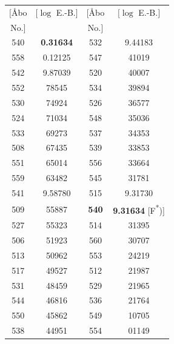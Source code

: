 \documentclass[12pt,a4paper]{article}
\theoremstyle{plain}
\theoremstyle{definition}
\theoremstyle{remark}
\begin{document}
\begin{small}
\begin{center}
\begin{tabular}{|c|c||c|c|}
\hline
$[$\AA bo & $[\log$ E.-B.$]$ & $[$\AA bo & $[\log$ E.-B.$]$ \\
No.$]$ & & No.$]$ & \\
\hline
540 & \textbf{0.31634} & 532 & 9.44183 \\
558 & 0.12125 & 547 & 41019 \\
542 & 9.87039 & 520 & 40007 \\
552 & 78545 & 534 & 39894 \\
530 & 74924 & 526 & 36577 \\
524 & 71034 & 548 & 35036 \\
533 & 69273 & 537 & 34353 \\
508 & 67435 & 539 & 33853 \\
551 & 65014 & 556 & 33664 \\
559 & 63482 & 545 & 31781 \\
\hline
541 & 9.58780 & 515 & 9.31730 \\
509 & 55887 & \textbf{540} & \textbf{9.31634} [F\textsuperscript{*})] \\
527 & 55323 & 514 & 31395 \\
506 & 51923 & 560 & 30707 \\
513 & 50962 & 553 & 24219 \\
517 & 49527 & 512 & 21987 \\
531 & 48459 & 529 & 21965 \\
544 & 46816 & 536 & 21764 \\
550 & 45862 & 549 & 10705 \\
538 & 44951 & 554 & 01149 \\
\hline
\end{tabular}
\end{center}
\end{small}
\end{document}
